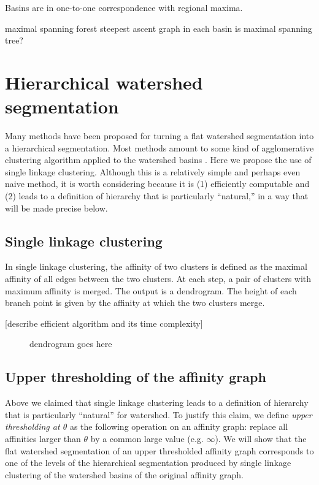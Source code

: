 \documentclass{article}
\begin{document}
Basins are in one-to-one correspondence with regional maxima.

maximal spanning forest
steepest ascent graph in each basin is maximal spanning tree?

\section{Hierarchical watershed segmentation}
Many methods have been proposed for turning a flat watershed
segmentation into a hierarchical segmentation.  Most methods amount to
some kind of agglomerative clustering algorithm applied to the
watershed basins \cite{beucher1994watershed, Najman1996}.  Here we
propose the use of single linkage clustering.  Although this is a
relatively simple and perhaps even naive method, it is worth
considering because it is (1) efficiently computable and (2) leads to
a definition of hierarchy that is particularly ``natural,'' in a way
that will be made precise below.

\subsection{Single linkage clustering}
In single linkage clustering, the affinity of two clusters is defined
as the maximal affinity of all edges between the two clusters.  At
each step, a pair of clusters with maximum affinity is merged.  The
output is a dendrogram.  The height of each branch point is given by
the affinity at which the two clusters merge.

[describe efficient algorithm and its time complexity]


\begin{figure}
\caption{dendrogram goes here}
\end{figure}

\subsection{Upper thresholding of the affinity graph}
Above we claimed that single linkage clustering leads to a definition
of hierarchy that is particularly ``natural'' for watershed.  To
justify this claim, we define \emph{upper thresholding at $\theta$} as
the following operation on an affinity graph: replace all affinities
larger than $\theta$ by a common large value (e.g. $\infty$).  We will
show that the flat watershed segmentation of an upper thresholded
affinity graph corresponds to one of the levels of the hierarchical
segmentation produced by single linkage clustering of the watershed
basins of the original affinity graph.
\end{document}
